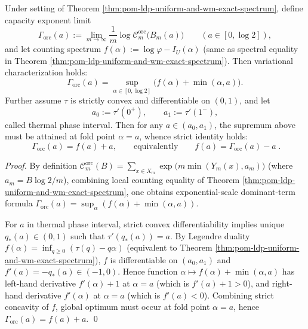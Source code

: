 \begin{theorem}[Thermal phase cut identity: capacity exponent dominated by single layer \texorpdfstring{$\alpha=a$}{alpha=a} on \texorpdfstring{$(a_0,a_1)$}{(a0,a1)}]\label{thm:pom-oracle-capacity-thermal-cut}
Under setting of Theorem \ref{thm:pom-ldp-uniform-and-wm-exact-spectrum}, define capacity exponent limit
\[
\Gamma_{\mathrm{orc}}(a):=\lim_{m\to\infty}\frac{1}{m}\log \mathcal{C}^{\mathrm{orc}}_m\bigl(B_m(a)\bigr)
\qquad (a\in[0,\log 2]),
\]
and let counting spectrum \(f(\alpha):=\log\varphi-I_U(\alpha)\) (same as spectral equality in Theorem \ref{thm:pom-ldp-uniform-and-wm-exact-spectrum}).
Then variational characterization holds:
\[
\Gamma_{\mathrm{orc}}(a)=\sup_{\alpha\in[0,\log 2]}\bigl(f(\alpha)+\min(\alpha,a)\bigr).
\]
Further assume \(\tau\) is strictly convex and differentiable on \((0,1)\), and let
\[
a_0:=\tau'(0^+),\qquad a_1:=\tau'(1^-),
\]
called thermal phase interval.
Then for any \(a\in(a_0,a_1)\), the supremum above must be attained at fold point \(\alpha=a\), whence strict identity holds:
\[
\boxed{\;
\Gamma_{\mathrm{orc}}(a)=f(a)+a,
\qquad\text{equivalently}\qquad
f(a)=\Gamma_{\mathrm{orc}}(a)-a\; } .
\]
\end{theorem}
\begin{proof}
By definition
\(
\mathcal{C}^{\mathrm{orc}}_m(B)=\sum_{x\in X_m} \exp\!\bigl(m\min(Y_m(x),a_m)\bigr)
\)
(where \(a_m=B\log2/m\)), combining local counting equality of Theorem \ref{thm:pom-ldp-uniform-and-wm-exact-spectrum}, one obtains exponential-scale dominant-term formula
\(
\Gamma_{\mathrm{orc}}(a)=\sup_\alpha(f(\alpha)+\min(\alpha,a))
\).
\par
For \(a\) in thermal phase interval, strict convex differentiability implies unique \(q_*(a)\in(0,1)\) such that \(\tau'(q_*(a))=a\).
By Legendre duality \(f(\alpha)=\inf_{q\ge 0}(\tau(q)-q\alpha)\) (equivalent to Theorem \ref{thm:pom-ldp-uniform-and-wm-exact-spectrum}), \(f\) is differentiable on \((a_0,a_1)\) and
\(f'(a)=-q_*(a)\in(-1,0)\).
Hence function \(\alpha\mapsto f(\alpha)+\min(\alpha,a)\) has left-hand derivative \(f'(\alpha)+1\) at \(\alpha=a\) (which is \(f'(a)+1>0\)), and right-hand derivative \(f'(\alpha)\) at \(\alpha=a\) (which is \(f'(a)<0\)).
Combining strict concavity of \(f\), global optimum must occur at fold point \(\alpha=a\), hence \(\Gamma_{\mathrm{orc}}(a)=f(a)+a\). \qed
\end{proof}

